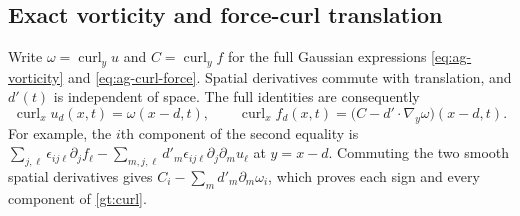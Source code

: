 \subsection{Exact vorticity and force-curl translation}

Write $\omega=\operatorname{curl}_y u$ and
$C=\operatorname{curl}_y f$ for the full Gaussian expressions
\eqref{eq:ag-vorticity} and \eqref{eq:ag-curl-force}.
Spatial derivatives commute with translation, and $d'(t)$ is
independent of space. The full identities are consequently
\begin{equation}
 \operatorname{curl}_xu_d(x,t)=\omega(x-d,t),\qquad
 \operatorname{curl}_xf_d(x,t)
   =\bigl(C-d'\cdot\nabla_y\omega\bigr)(x-d,t).
 \label{gt:curl}
\end{equation}
For example, the $i$th component of the second equality is
$\sum_{j,\ell}\epsilon_{ij\ell}\partial_jf_\ell
 -\sum_{m,j,\ell}d'_m\epsilon_{ij\ell}
           \partial_j\partial_m u_\ell$ at $y=x-d$.
Commuting the two smooth spatial derivatives gives
$C_i-\sum_m d'_m\partial_m\omega_i$, which proves each sign
and every component of \eqref{gt:curl}.

